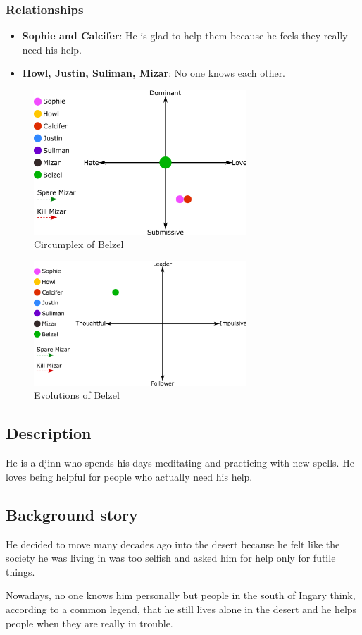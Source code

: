 \subsubsection*{Relationships}
\begin{itemize}
\item \textbf{Sophie and Calcifer}: He is glad to help them because he feels they really need his help.
\item \textbf{Howl, Justin, Suliman, Mizar}: No one knows each other.
\end{itemize}

\begin{figure}[H]
  \centering
  \includegraphics[width=8cm]{Images/Diagrams/Circumplexes/belzelCircumplex}
  \caption{Circumplex of Belzel}
\end{figure}

\begin{figure}[H]
   \centering
   \includegraphics[width=8cm]{Images/Diagrams/Evolutions/belzelEvolution}
   \caption{Evolutions of Belzel}
\end{figure}

\subsection{Description}
He is a djinn who spends his days meditating and practicing with new spells. He loves being helpful for people who actually need his help.

\subsection{Background story}
He decided to move many decades ago into the desert because he felt like the society he was living in was too selfish and asked him for help only for futile things.

Nowadays, no one knows him personally but people in the south of Ingary think, according to a common legend, that he still lives alone in the desert and he helps people when they are really in trouble.
